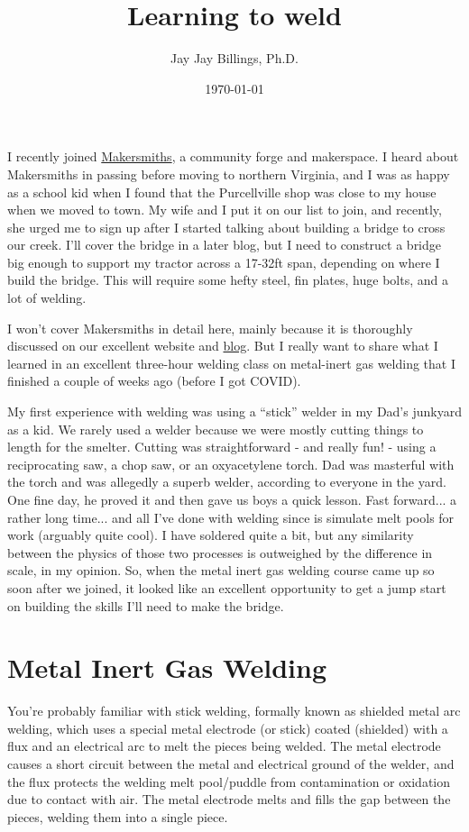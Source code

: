 \documentclass{article}
\title{Learning to weld}
\author{Jay Jay Billings, Ph.D.}
\date{\today}
\begin{document}
\maketitle

I recently joined \href{https://makersmiths.org/}{Makersmiths}, a community forge and makerspace. I heard about Makersmiths in passing before moving to northern Virginia, and I was as happy as a school kid when I found that the Purcellville shop was close to my house when we moved to town. My wife and I put it on our list to join, and recently, she urged me to sign up after I started talking about building a bridge to cross our creek. I'll cover the bridge in a later blog, but I need to construct a bridge big enough to support my tractor across a 17-32ft span, depending on where I build the bridge. This will require some hefty steel, fin plates, huge bolts, and a lot of welding.

I won't cover Makersmiths in detail here, mainly because it is thoroughly discussed on our excellent website and \href{https://makersmiths.org/Blog}{blog}. But I really want to share what I learned in an excellent three-hour welding class on metal-inert gas welding that I finished a couple of weeks ago (before I got COVID).

My first experience with welding was using a ``stick'' welder in my Dad's junkyard as a kid. We rarely used a welder because we were mostly cutting things to length for the smelter. Cutting was straightforward - and really fun! - using a reciprocating saw, a chop saw, or an oxyacetylene torch. Dad was masterful with the torch and was allegedly a superb welder, according to everyone in the yard. One fine day, he proved it and then gave us boys a quick lesson. Fast forward... a rather long time... and all I've done with welding since is simulate melt pools for work (arguably quite cool). I have soldered quite a bit, but any similarity between the physics of those two processes is outweighed by the difference in scale, in my opinion. So, when the metal inert gas welding course came up so soon after we joined, it looked like an excellent opportunity to get a jump start on building the skills I'll need to make the bridge.

\section*{Metal Inert Gas Welding}

You're probably familiar with stick welding, formally known as shielded metal arc welding, which uses a special metal electrode (or stick) coated (shielded) with a flux and an electrical arc to melt the pieces being welded. The metal electrode causes a short circuit between the metal and electrical ground of the welder, and the flux protects the welding melt pool/puddle from contamination or oxidation due to contact with air. The metal electrode melts and fills the gap between the pieces, welding them into a single piece.
\end{document}
